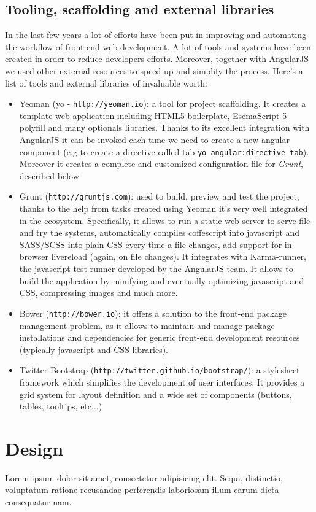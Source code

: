 \documentclass[a4paper,12pt]{report}
\begin{document}
\subsection{Tooling, scaffolding and external libraries}
In the last few years a lot of efforts have been put in improving and automating the workflow of front-end web development. A lot of tools and systems have been created in order to reduce developers efforts. 
Moreover, together with AngularJS we used other external resources to speed up and simplify the process. Here's a list of tools and external libraries of invaluable worth:
\begin{itemize}
\item Yeoman (yo - \texttt{http://yeoman.io}): a tool for project scaffolding. It creates a template web application including HTML5 boilerplate, EscmaScript 5 polyfill and many optionals libraries. Thanks to its excellent integration with AngularJS it can be invoked each time we need to create a new angular component (e.g to create a directive called tab \texttt{yo angular:directive tab}). Moreover it creates a complete and customized configuration file for \emph{Grunt}, described below
\item Grunt (\texttt{http://gruntjs.com}): used to build, preview and test the project, thanks to the help from tasks created using Yeoman it's very well integrated in the ecosystem. Specifically, it allows to run a static web server to serve file and try the systems, automatically compiles coffescript into javascript and SASS/SCSS into plain CSS every time a file changes, add support for in-browser livereload (again, on file changes). It integrates with Karma-runner, the javascript test runner developed by the AngularJS team. It allows to build the application by minifying and eventually optimizing javascript and CSS, compressing images and much more.
\item Bower (\texttt{http://bower.io}): it offers a solution to the front-end package management problem, as it allows to maintain and manage package installations and dependencies for generic front-end development resources (typically javascript and CSS libraries). 
\item Twitter Bootstrap (\texttt{http://twitter.github.io/bootstrap/}): a stylesheet framework which simplifies the development of user interfaces. It provides a grid system for layout definition and a wide set of components (buttons, tables, tooltips, etc...) 
\end{itemize}
\section{Design}
Lorem ipsum dolor sit amet, consectetur adipisicing elit. Sequi, distinctio, voluptatum ratione recusandae perferendis laboriosam illum earum dicta consequatur nam.
\end{document}
